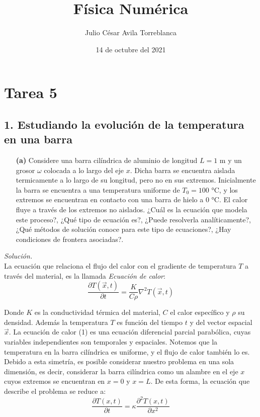 \documentclass[11pt]{article}
\title{Física Numérica}
\author{Julio César Avila Torreblanca}
\date{14 de octubre del 2021}
\begin{document}
\maketitle

\section*{Tarea 5}
\subsection*{\textbf{1. Estudiando la evolución de la temperatura en una barra}}
\begin{enumerate}
	\item [\textbf{(a)}] Considere una barra cilíndrica de aluminio de longitud $L= 1$ m y un grosor $\omega$ colocada a lo largo del eje $x$. Dicha barra se encuentra aislada termicamente a lo largo de su longitud, pero no en sus extremos. Inicialmente la barra se encuentra a una temperatura uniforme de $T_0 = 100$ °C, y los extremos se encuentran en contacto con una barra de hielo a 0 °C. El calor fluye a través de los extremos no aislados. ¿Cuál es la ecuación que modela este proceso?, ¿Qué tipo de ecuación es?, ¿Puede resolverla analíticamente?, ¿Qué métodos de solución conoce para este tipo de ecuaciones?, ¿Hay condiciones de frontera asociadas?.
\end{enumerate}
\textit{Solución.}\\
	 La ecuación que relaciona el flujo del calor con el gradiente de temperatura $T$ a través del material, es la llamada \textit{Ecuación de calor}:
	 \begin{equation}
	 	\frac{\partial T (\vec{x},t)}{\partial t} = \frac{K}{C \rho} \nabla^2 T (\vec{x},t)		\label{1}
	 \end{equation} 
	 
	 Donde $K$ es la conductividad térmica del material, $C$ el calor específico y $\rho$ su densidad. Además la temperatura $T$ es función del tiempo $t$ y del vector espacial $\vec{x}$. La ecuación de calor (1) es una ecuación diferencial parcial parabólica, cuyas variables independientes son temporales y espaciales.  
	 Notemos que la temperatura en la barra cilíndrica es uniforme, y el flujo de calor también lo es. Debido a esta simetría, es posible considerar nuestro problema en una sola dimensión, es decir, considerar la barra cilíndrica como un alambre en el eje $x$ cuyos extremos se encuentran en $x=0$ y $x=L$. De esta forma, la ecuación que describe el problema se reduce a:
	 \begin{equation}
	 	\frac{\partial T (x,t)}{\partial t} = \kappa \frac{\partial^2 T (x,t)}{\partial x^2}	\label{2}
	 \end{equation}
	 
\end{document}
